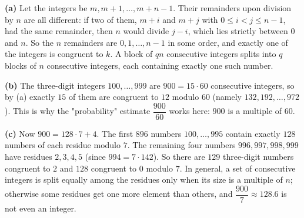 \textbf{(a)} Let the integers be $m,m+1,\dots,m+n-1$. Their remainders upon division by $n$ are all different: if two of them, $m+i$ and $m+j$ with $0\le i<j\le n-1$, had the same remainder, then $n$ would divide $j-i$, which lies strictly between $0$ and $n$. So the $n$ remainders are $0,1,\dots,n-1$ in some order, and exactly one of the integers is congruent to $k$. A block of $qn$ consecutive integers splits into $q$ blocks of $n$ consecutive integers, each containing exactly one such number.

\textbf{(b)} The three-digit integers $100,\dots,999$ are $900=15\cdot60$ consecutive integers, so by (a) exactly $\boxed{15}$ of them are congruent to $12$ modulo $60$ (namely $132,192,\dots,972$). This is why the "probability" estimate $\dfrac{900}{60}$ works here: $900$ is a multiple of $60$.

\textbf{(c)} Now $900=128\cdot7+4$. The first $896$ numbers $100,\dots,995$ contain exactly $128$ numbers of each residue modulo $7$. The remaining four numbers $996,997,998,999$ have residues $2,3,4,5$ (since $994=7\cdot142$). So there are $\boxed{129}$ three-digit numbers congruent to $2$ and $\boxed{128}$ congruent to $0$ modulo $7$. In general, a set of consecutive integers is split equally among the residues only when its size is a multiple of $n$; otherwise some residues get one more element than others, and $\dfrac{900}{7}\approx128.6$ is not even an integer.
